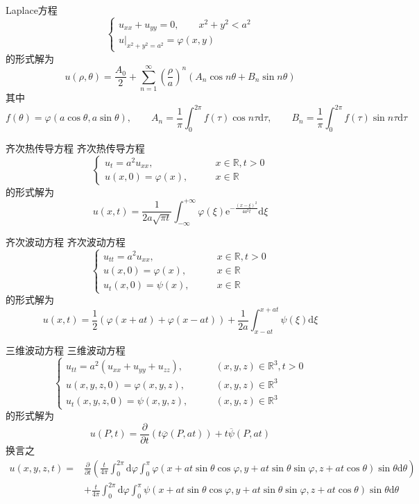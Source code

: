 \documentclass[lang = cn, scheme = chinese, thmcnt = section]{elegantbook}
\newcommand{\R}{\mathbb{R}}            %
\newcommand{\dd}{\mathrm{d}}           %
\newcommand{\ee}[1]{\mathrm{e}^{#1}}   %
\begin{document}
\begin{theorem}
	Laplace方程%
	$$
	\begin{cases}
		u_{xx}+u_{yy}=0,\qquad x^2+y^2<a^2\\
		u|_{x^2+y^2=a^2}=\varphi(x,y)
	\end{cases}
	$$
	的形式解为%
	$$
	u(\rho,\theta)=\frac{A_0}{2}+\sum_{n=1}^{\infty}\left(\frac{\rho}{a}\right)^n\left(A_n\cos n\theta+B_n\sin n\theta\right)
	$$
	其中
	$$
	f(\theta)=\varphi(a\cos\theta,a\sin\theta),\qquad 
	A_n=\frac{1}{\pi}\int_{0}^{2\pi}f(\tau)\cos n \tau\dd \tau,\qquad 
	B_n=\frac{1}{\pi}\int_{0}^{2\pi}f(\tau)\sin n \tau\dd \tau
	$$
\end{theorem}

\begin{theorem}{齐次热传导方程}
	齐次热传导方程
	$$
	\begin{cases}
		u_t=a^2u_{xx},\qquad & x\in\R,t>0\\
		u(x,0)=\varphi(x),\qquad & x\in\R
	\end{cases}
	$$
	的形式解为
	$$
	u(x,t)
	=\frac{1}{2a\sqrt{\pi t}}\int_{-\infty}^{+\infty}\varphi(\xi)\ee{-\frac{(x-\xi)^2}{4a^2t}}\dd\xi
	$$
\end{theorem}

\begin{theorem}{齐次波动方程}
	齐次波动方程
	$$
	\begin{cases}
		u_{tt}=a^2u_{xx},\qquad & x\in\R,t>0\\
		u(x,0)=\varphi(x),\qquad & x\in\R\\
		u_t(x,0)=\psi(x),\qquad & x\in\R
	\end{cases}
	$$
	的形式解为
	$$
	u(x,t)
	= \frac{1}{2}(\varphi(x+at)+\varphi(x-at))+\frac{1}{2a}\int_{x-at}^{x+at}\psi(\xi)\dd\xi
	$$
\end{theorem}

\begin{theorem}{三维波动方程}
	三维波动方程
	$$
	\begin{cases}
		u_{tt}=a^2(u_{xx}+u_{yy}+u_{zz}),\qquad & (x,y,z)\in \R^3,t>0\\
		u(x,y,z,0)=\varphi(x,y,z),\qquad & (x,y,z)\in \R^3\\
		u_t(x,y,z,0)=\psi(x,y,z),\qquad & (x,y,z)\in \R^3
	\end{cases}
	$$
	的形式解为
	$$
	u(P,t)
	=\frac{\partial}{\partial t}(t\overline{\varphi}(P,at))
	+t\overline{\psi}(P,at)
	$$
	换言之
	\begin{align*}
		u(x,y,z,t)
		= & \frac{\partial}{\partial t}\left(\frac{t}{4\pi}\int_{0}^{2\pi}\dd\varphi\int_{0}^{\pi}\varphi(x+at\sin\theta\cos\varphi,y+at\sin\theta\sin\varphi,z+at\cos\theta)\sin\theta\dd\theta\right)\\
		& + \frac{t}{4\pi}\int_{0}^{2\pi}\dd\varphi\int_{0}^{\pi}\psi(x+at\sin\theta\cos\varphi,y+at\sin\theta\sin\varphi,z+at\cos\theta)\sin\theta\dd\theta
	\end{align*}
\end{theorem}
\end{document}
